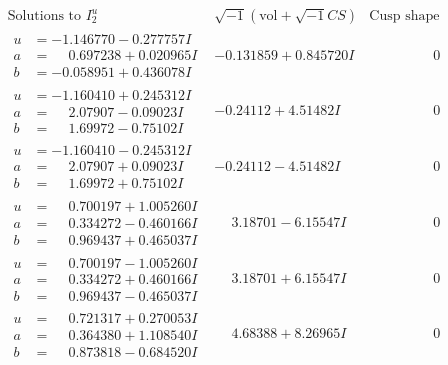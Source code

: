 \documentclass[1p]{elsarticle_modified}
\theoremstyle{definition}
\newcommand{\I}{\sqrt{-1}}
\begin{document}
$$\begin{array}{c|c|c}
\text{Solutions to }I^u_{2}& \I (\text{vol} + \sqrt{-1}CS) & \text{Cusp shape}\\
 \hline 
\begin{aligned}
u &= -1.146770 - 0.277757 I \\
a &= \phantom{-}0.697238 + 0.020965 I \\
b &= -0.058951 + 0.436078 I\end{aligned}
 & -0.131859 + 0.845720 I & \phantom{-0.000000 } 0 \\ \hline\begin{aligned}
u &= -1.160410 + 0.245312 I \\
a &= \phantom{-}2.07907 - 0.09023 I \\
b &= \phantom{-}1.69972 - 0.75102 I\end{aligned}
 & -0.24112 + 4.51482 I & \phantom{-0.000000 } 0 \\ \hline\begin{aligned}
u &= -1.160410 - 0.245312 I \\
a &= \phantom{-}2.07907 + 0.09023 I \\
b &= \phantom{-}1.69972 + 0.75102 I\end{aligned}
 & -0.24112 - 4.51482 I & \phantom{-0.000000 } 0 \\ \hline\begin{aligned}
u &= \phantom{-}0.700197 + 1.005260 I \\
a &= \phantom{-}0.334272 - 0.460166 I \\
b &= \phantom{-}0.969437 + 0.465037 I\end{aligned}
 & \phantom{-}3.18701 - 6.15547 I & \phantom{-0.000000 } 0 \\ \hline\begin{aligned}
u &= \phantom{-}0.700197 - 1.005260 I \\
a &= \phantom{-}0.334272 + 0.460166 I \\
b &= \phantom{-}0.969437 - 0.465037 I\end{aligned}
 & \phantom{-}3.18701 + 6.15547 I & \phantom{-0.000000 } 0 \\ \hline\begin{aligned}
u &= \phantom{-}0.721317 + 0.270053 I \\
a &= \phantom{-}0.364380 + 1.108540 I \\
b &= \phantom{-}0.873818 - 0.684520 I\end{aligned}
 & \phantom{-}4.68388 + 8.26965 I & \phantom{-0.000000 } 0 \\ \hline\begin{aligned}

\end{aligned}
\end{array}$$
\end{document}

